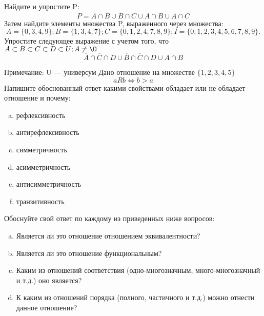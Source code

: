 \documentclass[10pt]{exam}
\begin{document}
\begin{questions}
\question
Найдите и упростите P:
\begin{equation*}
\overline{P} = A \cap \overline{B} \cup \overline{B} \cap C \cup \overline{A} \cap \overline{B} \cup \overline{A} \cap C
\end{equation*}
Затем найдите элементы множества P, выраженного через множества:
\begin{equation*}
A = \{0, 3, 4, 9\}; 
B = \{1, 3, 4, 7\};
C = \{0, 1, 2, 4, 7, 8, 9\};
I = \{0, 1, 2, 3, 4, 5, 6, 7, 8, 9\}.
\end{equation*}\question
Упростите следующее выражение с учетом того, что $A\subset B \subset C \subset D \subset U; A \neq \O$
\begin{equation*}
\overline{A} \cap \overline{C} \cap D \cup \overline{B} \cap \overline{C} \cap D \cup A \cap B
\end{equation*}

Примечание: U — универсум\question
Дано отношение на множестве $\{1, 2, 3, 4, 5\}$ 
\begin{equation*}
aRb \iff b > a
\end{equation*}
Напишите обоснованный ответ какими свойствами обладает или не обладает отношение и почему:   
\begin{enumerate} [a)]\setcounter{enumi}{0}
\item рефлексивность
\item антирефлексивность
\item симметричность
\item асимметричность
\item антисимметричность
\item транзитивность
\end{enumerate}

Обоснуйте свой ответ по каждому из приведенных ниже вопросов:
\begin{enumerate} [a)]\setcounter{enumi}{0}
    \item Является ли это отношение отношением эквивалентности?
    \item Является ли это отношение функциональным?
    \item Каким из отношений соответствия (одно-многозначным, много-многозначный и т.д.) оно является?
    \item К каким из отношений порядка (полного, частичного и т.д.) можно отнести данное отношение?
\end{enumerate}


\end{questions}
\end{document}
